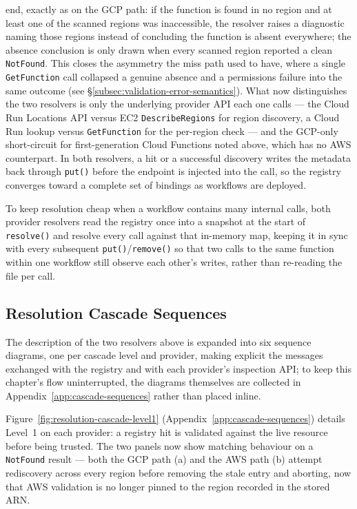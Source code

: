 end, exactly as on the GCP path: if the function is found in no region and at least one of the
scanned regions was inaccessible, the resolver raises a diagnostic naming those regions instead of
concluding the function is absent everywhere; the absence conclusion is only drawn when every
scanned region reported a clean \texttt{NotFound}. This closes the asymmetry the miss path used to
have, where a single \texttt{GetFunction} call collapsed a genuine absence and a permissions
failure into the same outcome (see \S\ref{subsec:validation-error-semantics}). What now
distinguishes the two resolvers is only the underlying provider API each one calls --- the Cloud
Run Locations API versus EC2 \texttt{DescribeRegions} for region discovery, a Cloud Run lookup
versus \texttt{GetFunction} for the per-region check --- and the GCP-only short-circuit for
first-generation Cloud Functions noted above, which has no AWS counterpart. In both resolvers, a hit or a
successful discovery writes the metadata back through \texttt{put()} before the endpoint is
injected into the call, so the registry converges toward a complete set of bindings as workflows
are deployed.

To keep resolution cheap when a workflow contains many internal calls, both provider resolvers
read the registry once into a snapshot at the start of \texttt{resolve()} and resolve every call
against that in-memory map, keeping it in sync with every subsequent \texttt{put()}/\texttt{remove()}
so that two calls to the same function within one workflow still observe each other's writes,
rather than re-reading the file per call.

\subsection{Resolution Cascade Sequences}
\label{subsec:cascade-sequences}

The description of the two resolvers above is expanded into six sequence diagrams, one per
cascade level and provider, making explicit the messages exchanged with the registry and with
each provider's inspection API; to keep this chapter's flow uninterrupted, the diagrams themselves
are collected in Appendix~\ref{app:cascade-sequences} rather than placed inline.

Figure~\ref{fig:resolution-cascade-level1} (Appendix~\ref{app:cascade-sequences}) details Level~1
on each provider: a registry hit is validated against the live resource before being trusted. The
two panels now show matching behaviour on a \texttt{NotFound} result --- both the GCP path (a) and
the AWS path (b) attempt rediscovery across every region before removing the stale entry and
aborting, now that AWS validation is no longer pinned to the region recorded in the stored ARN.

